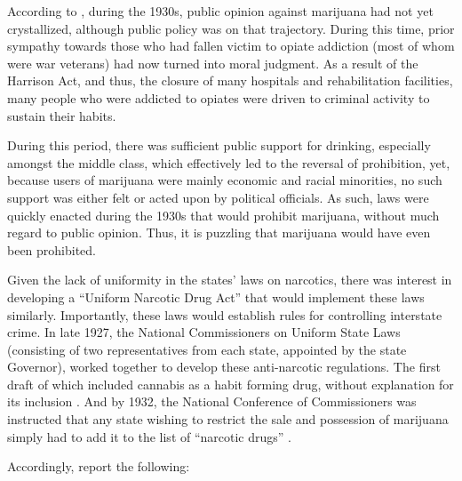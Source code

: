 According to \citet{bonnie_and_whitebread_1970}, during the 1930s, public opinion against marijuana had not yet crystallized, although public policy was on that trajectory. During this time, prior sympathy towards those who had fallen victim to opiate addiction (most of whom were war veterans) had now turned into moral judgment. As a result of the Harrison Act, and thus, the closure of many hospitals and rehabilitation facilities, many people who were addicted to opiates were driven to criminal activity to sustain their habits. 


During this period, there was sufficient public support for drinking, especially amongst the middle class, which effectively led to the reversal of prohibition, yet, because users of marijuana were mainly economic and racial minorities, no such support was either felt or acted upon by political officials. As such, laws were quickly enacted during the 1930s that would prohibit marijuana, without much regard to public opinion. Thus, it is puzzling that marijuana would have even been prohibited.

Given the lack of uniformity in the states' laws on narcotics, there was interest in developing a ``Uniform Narcotic Drug Act'' that would implement these laws similarly. Importantly, these laws would establish rules for controlling interstate crime. In late 1927, the National Commissioners on Uniform State Laws (consisting of two representatives from each state, appointed by the state Governor), worked together to develop these anti-narcotic regulations. The first draft of which included cannabis as a habit forming drug, without explanation for its inclusion \citep{bonnie_and_whitebread_1970}. And by 1932, the National Conference of Commissioners was instructed that any state wishing to restrict the sale and possession of marijuana simply had to add it to the list of ``narcotic drugs'' \citep{terry_and_pellens_1928}. 

Accordingly, \citet{bonnie_and_whitebread_1970} report the following:

\begin{quotation}
\begin{singlespace}
\end{singlespace}
\end{quotation}

